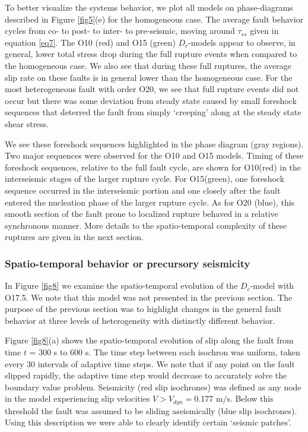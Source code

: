 \documentclass[preprint,1p, 10pt,authoryear]{elsarticle}
\begin{document}
To better visualize the systems behavior, we plot all models on phase-diagrams described in Figure \ref{fig5}(e) for the homogeneous case. The average fault behavior cycles from co- to post- to inter- to pre-seismic, moving around $\tau_{ss}$ given in equation \eqref{eq7}. The O10 (red) and O15 (green) $D_{c}$-models appear to observe, in general, lower total stress drop during the full rupture events when compared to the homogeneous case.  We also see that during these full ruptures, the average slip rate on these faults is in general lower than the homogeneous case.  For the most heterogeneous fault with order O20, we see that full rupture events did not occur but there was some deviation from steady state caused by small foreshock sequences that deterred the fault from simply `creeping' along at the steady state shear stress. 

We see these foreshock sequences highlighted in the phase diagram (gray regions). Two major sequences were observed for the O10 and O15 models. Timing of these foreshock sequences, relative to the full fault cycle, are shown for O10(red) in the interseismic stages of the larger rupture cycle. For O15(green), one foreshock sequence occurred in the interseismic portion and one closely after the fault entered the nucleation phase of the larger rupture cycle. As for O20 (blue), this smooth section of the fault prone to localized rupture behaved in a relative synchronous manner. More details to the spatio-temporal complexity of these ruptures are given in the next section. 

\subsubsection{Spatio-temporal behavior or precursory seismicity }
\label{spatialmodel}

In Figure \ref{fig8} we examine the spatio-temporal evolution of the $D_{c}$-model with O17.5. We note that this model was not presented in the previous section. The purpose of the previous section was to highlight changes in the general fault behavior at three levels of heterogeneity  with distinctly different behavior.

Figure \ref{fig8}(a) shows the spatio-temporal evolution of slip along the fault from time $t$ = 300 s to 600 s. The time step between each isochron was uniform, taken every 30 intervals of adaptive time steps.  We note that if any point on the fault slipped rapidly, the adaptive time step would decrease to accurately solve the boundary value problem. Seismicity (red slip isochrones) was defined as any node in the model experiencing slip velocities $V > V_{dyn}=$0.177 m/s. Below this threshold the fault was assumed to be sliding aseismically (blue slip isochrones). Using this description we were able to clearly identify certain `seismic patches'.
\end{document}
